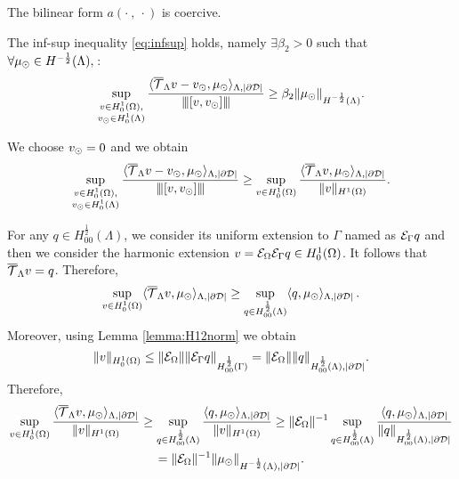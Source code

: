 \begin{lemma}\label{lemma:prob2_coercivity}
The bilinear form $a(\cdot \ , \ \cdot)$ is coercive.
\end{lemma}

\begin{lemma}
The inf-sup inequality \eqref{eq:infsup} holds, namely $ \exists \beta_2 >0$ such that $\forall \mu_{\odot} \in H^{-\frac 12}(\Lambda),\,$:
\begin{equation*}
\sup _{\substack{v\in H^1_0(\Omega),\\ v_{\odot} \in H^1_0(\Lambda)}} \frac{ \langle {\overline{\mathcal{T}}_\Lambda} v - v_{\odot}, \mu_{\odot} \rangle_{\Lambda,|\partial\mathcal{D}|}}{{\left\vert\kern-0.25ex\left\vert\kern-0.25ex\left\vert [v,v_{\odot}] \right\vert\kern-0.25ex\right\vert\kern-0.25ex\right\vert}}
\geq \beta_2 \|\mu_{\odot}\|_{H^{-\frac 12}(\Lambda)}.
\end{equation*}
\end{lemma} 
We choose $v_{\odot}=0$ and we obtain
\begin{equation*}
\sup _{\substack{v\in H^1_0(\Omega),\\ v_{\odot} \in H^1_0(\Lambda)}} \frac{ \langle {\overline{\mathcal{T}}_\Lambda} v - v_{\odot}, \mu_{\odot} \rangle_{\Lambda,|\partial\mathcal{D}|}}{{\left\vert\kern-0.25ex\left\vert\kern-0.25ex\left\vert [v,v_{\odot}] \right\vert\kern-0.25ex\right\vert\kern-0.25ex\right\vert}}
\geq \sup _{v\in H^1_0(\Omega)} \frac{ \langle {\overline{\mathcal{T}}_\Lambda} v, \mu_{\odot} \rangle_{\Lambda,|\partial\mathcal{D}|}}{\|v\|_{H^1(\Omega)}}. 
\end{equation*}

For any $q \in H^{\frac 12}_{00}(\Lambda)$, we consider its uniform extension to $\Gamma$ named as $\mathcal{E}_\Gamma q$
and then we consider the harmonic extension $v=\mathcal{E}_\Omega \mathcal{E}_\Gamma q\in H^1_0(\Omega)$. It follows that ${\overline{\mathcal{T}}_\Lambda} v=q$. Therefore, 
\begin{equation*}
\sup _{v\in H^1_0(\Omega)}  \langle {\overline{\mathcal{T}}_\Lambda} v, \mu_{\odot} \rangle_{\Lambda,|\partial\mathcal{D}|} \geq\sup_{q \in H^{\frac 12}_{00}(\Lambda)} \langle q, \mu_{\odot}  \rangle_{\Lambda,|\partial\mathcal{D}|}\,.
\end{equation*}
Moreover, using Lemma \ref{lemma:H12norm} we obtain
\begin{equation*}
\|v\|_{H^1_0(\Omega)}\leq \|\mathcal{E}_\Omega\| \|\mathcal{E}_\Gamma q\|_{H^{\frac 12}_{00}(\Gamma)}  = \|\mathcal{E}_\Omega\| \|q\|_{H^{\frac 12}_{00}(\Lambda),|\partial\mathcal{D}|}.
\end{equation*}
 Therefore,
\begin{multline*}
\sup _{v\in H^1_0(\Omega)} \frac{ \langle {\overline{\mathcal{T}}_\Lambda} v, \mu_{\odot} \rangle_{\Lambda,|\partial\mathcal{D}|}}{\|v\|_{H^1(\Omega)}}
\geq \sup _{q\in H^{\frac 12}_{00}(\Lambda)} \frac{ \langle q, \mu_{\odot} \rangle_{\Lambda,|\partial\mathcal{D}|}}{\|v\|_{H^1(\Omega)}}
\geq \|\mathcal{E}_\Omega\|^{-1} \sup _{q\in H^{\frac 12}_{00}(\Lambda)} \frac{ \langle q, \mu_{\odot} \rangle_{\Lambda,|\partial\mathcal{D}|}}{\|q\|_{H^{\frac 12}_{00}(\Lambda),|\partial\mathcal{D}|}} 
\\= \|\mathcal{E}_\Omega\|^{-1} \|\mu_{\odot}\|_{H^{-\frac 12}(\Lambda),|\partial\mathcal{D}|}.
\end{multline*}



